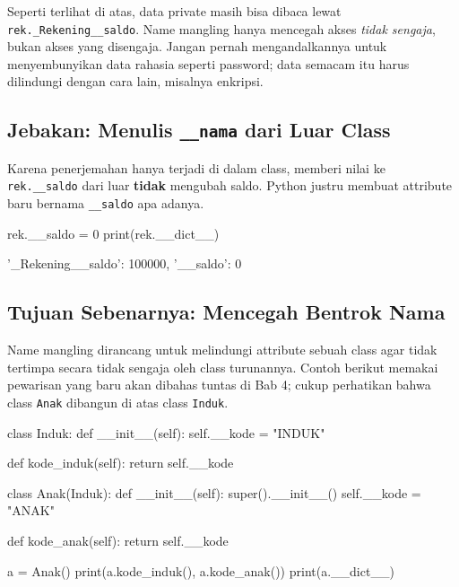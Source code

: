 \begin{penting}
Seperti terlihat di atas, data private masih bisa dibaca lewat \texttt{rek.\_Rekening\_\_saldo}. Name mangling hanya mencegah akses \emph{tidak sengaja}, bukan akses yang disengaja. Jangan pernah mengandalkannya untuk menyembunyikan data rahasia seperti password; data semacam itu harus dilindungi dengan cara lain, misalnya enkripsi.
\end{penting}

\subsection{Jebakan: Menulis \texttt{\_\_nama} dari Luar Class}

Karena penerjemahan hanya terjadi di dalam class, memberi nilai ke \texttt{rek.\_\_saldo} dari luar \textbf{tidak} mengubah saldo. Python justru membuat attribute baru bernama \texttt{\_\_saldo} apa adanya.

\begin{kode}
rek.__saldo = 0
print(rek.__dict__)
\end{kode}

\begin{keluaran}
{'_Rekening__saldo': 100000, '__saldo': 0}
\end{keluaran}

\subsection{Tujuan Sebenarnya: Mencegah Bentrok Nama}

Name mangling dirancang untuk melindungi attribute sebuah class agar tidak tertimpa secara tidak sengaja oleh class turunannya. Contoh berikut memakai pewarisan yang baru akan dibahas tuntas di Bab 4; cukup perhatikan bahwa class \texttt{Anak} dibangun di atas class \texttt{Induk}.

\begin{kode}
class Induk:
    def __init__(self):
        self.__kode = "INDUK"

    def kode_induk(self):
        return self.__kode

class Anak(Induk):
    def __init__(self):
        super().__init__()
        self.__kode = "ANAK"

    def kode_anak(self):
        return self.__kode

a = Anak()
print(a.kode_induk(), a.kode_anak())
print(a.__dict__)
\end{kode}

